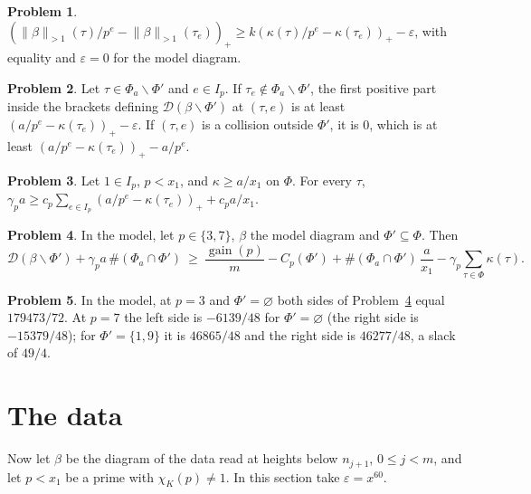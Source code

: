 \documentclass[reqno]{amsart}
\theoremstyle{plain}
\theoremstyle{definition}
\newtheorem{problem}{Problem}[section]
\theoremstyle{remark}
\newcommand{\Dc}{\mathcal D}
\newcommand{\gain}{\operatorname{gain}}
\newcommand{\nb}[1]{\lVert #1 \rVert}
\newcommand{\bb}{\nb{\beta}_{>1}}
\begin{document}
\begin{problem}\label{pr:low-rows}
\((\bb(\tau)/p^e - \bb(\tau_e))_+ \ge k(\kappa(\tau)/p^e - \kappa(\tau_e))_+ - \varepsilon\), with equality and \(\varepsilon = 0\) for the model diagram.
\end{problem}

\begin{problem}\label{pr:long-row}
Let \(\tau \in \Phi_a \smallsetminus \Phi'\) and \(e \in I_p\).  If \(\tau_e \notin \Phi_a \smallsetminus \Phi'\), the first positive part inside the brackets defining \(\Dc(\beta \smallsetminus \Phi')\) at \((\tau, e)\) is at least \((a/p^e - \kappa(\tau_e))_+ - \varepsilon\).  If \((\tau, e)\) is a collision outside \(\Phi'\), it is \(0\), which is at least \((a/p^e - \kappa(\tau_e))_+ - a/p^e\).
\end{problem}

\begin{problem}\label{pr:erased}
Let \(1 \in I_p\), \(p < x_1\), and \(\kappa \ge a/x_1\) on \(\Phi\).  For every \(\tau\), \(\gamma_p a \ge c_p \sum_{e \in I_p} (a/p^e - \kappa(\tau_e))_+ + c_p a/x_1\).
\end{problem}

\begin{problem}\label{pr:model-ineq}
In the model, let \(p \in \{3, 7\}\), \(\beta\) the model diagram and \(\Phi' \subseteq \Phi\).  Then
\[
  \Dc(\beta \smallsetminus \Phi') + \gamma_p a\, \#(\Phi_a \cap \Phi') \ \ge\ \frac{\gain(p)}{m} - C_p(\Phi') + \#(\Phi_a \cap \Phi')\, \frac{a}{x_1} - \gamma_p \sum_{\tau \in \Phi} \kappa(\tau) .
\]
\end{problem}

\begin{problem}\label{pr:toy-values}
In the model, at \(p = 3\) and \(\Phi' = \varnothing\) both sides of Problem~\ref{pr:model-ineq} equal \(179473/72\).  At \(p = 7\) the left side is \(-6139/48\) for \(\Phi' = \varnothing\) (the right side is \(-15379/48\)); for \(\Phi' = \{1, 9\}\) it is \(46865/48\) and the right side is \(46277/48\), a slack of \(49/4\).
\end{problem}

\section{The data}\label{sec:data}

Now let \(\beta\) be the diagram of the data read at heights below \(n_{j+1}\), \(0 \le j < m\), and let \(p < x_1\) be a prime with \(\chi_K(p) \ne 1\).  In this section take \(\varepsilon = x^{60}\).
\end{document}

